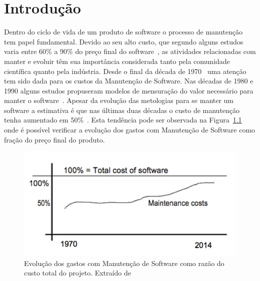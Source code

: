 \chapter{Introdução}
\label{ch:intro}

Dentro do ciclo de vida de um produto de software o processo de manutenção tem
papel fundamental. Devido ao seu alto custo, que segundo alguns estudos varia
entre 60\% a 90\% do preço final do software~\cite{kaur2015review}, as
atividades relacionadas com manter e evoluir têm sua importância considerada
tanto pela comunidade científica quanto pela indústria. Desde o final da década
de 1970~\cite{Zelkowitz:1979:PSE:578504} uma atenção tem sido dada para os
custos da Manutenção de Software. Nas décadas de 1980 e 1990 alguns estudos
propuseram modelos de mensuração do valor necessário para manter o
software~\cite{Herrin:1985:SMC:323287.323383,hirota1994approach}. Apesar da
evolução das metologias para se manter um software a estimativa é que nas
últimas duas décadas o custo de manutenção tenha aumentado em
50\%~\cite{koskinen2010software}. Esta tendência pode ser observada na
Figura~\ref{fig:software-maintence-costs} onde é possível verificar a evolução
dos gastos com Manutenção de Software como fração do preço final do produto.

\begin{figure}[htpb]
\centering
\includegraphics[width=0.6\linewidth]
				{./chapter-intro/img/software-maintence-costs.png}
\caption{Evolução dos gastos com Manutenção de Software como razão do custo
    total do projeto. Extraído de~\cite{engelbertink2010save}}
\label{fig:software-maintence-costs}
\end{figure}

